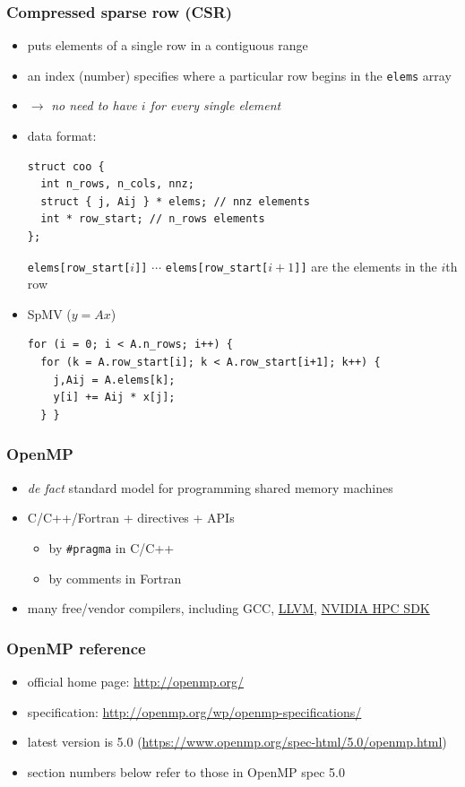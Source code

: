 \documentclass[12pt,dvipdfmx]{beamer}
\newcommand{\ao}[1]{{\color{blue}#1}}
\begin{document}
\begin{frame}[fragile]
  \frametitle{Compressed sparse row (CSR)}
  \begin{itemize}
  \item puts elements of a single row in a contiguous range 
  \item an index (number) specifies where a particular row begins
    in the {\tt elems} array
  \item $\rightarrow$ \ao{\it no need to have $i$ for every single element}
  \item data format:
\begin{lstlisting}
struct coo {
  int n_rows, n_cols, nnz;    
  struct { j, Aij } * elems; // nnz elements
  int * row_start; // n_rows elements
};
\end{lstlisting}
{\tt elems[row\_start[$i$]]} $\cdots$ {\tt elems[row\_start[$i+1$]]}
are the elements in the $i$th row
\item SpMV ($y = Ax$)
\begin{lstlisting}
for (i = 0; i < A.n_rows; i++) {
  for (k = A.row_start[i]; k < A.row_start[i+1]; k++) {
    j,Aij = A.elems[k];
    y[i] += Aij * x[j];
  } }
\end{lstlisting}
\end{itemize}
\end{frame}


\begin{frame}
\frametitle{OpenMP}
\begin{itemize}
\item {\em de fact\/} standard model for programming shared memory machines
\item C/C++/Fortran + \ao{directives + APIs}
  \begin{itemize}
  \item by \ao{\tt \#pragma} in C/C++
  \item by comments in Fortran
  \end{itemize}
\item many free/vendor compilers, including GCC,
  \href{https://llvm.org/}{LLVM},
  \href{https://docs.nvidia.com/hpc-sdk/index.html}{NVIDIA HPC SDK}
\end{itemize}
\end{frame}


\begin{frame}
\frametitle{OpenMP reference}
\begin{itemize}
\item official home page:
  \url{http://openmp.org/}
\item specification:
  \url{http://openmp.org/wp/openmp-specifications/}
\item latest version is 5.0
(\url{https://www.openmp.org/spec-html/5.0/openmp.html})
\item section numbers below refer to those in OpenMP spec 5.0
\end{itemize}

\end{frame}
\end{document}
